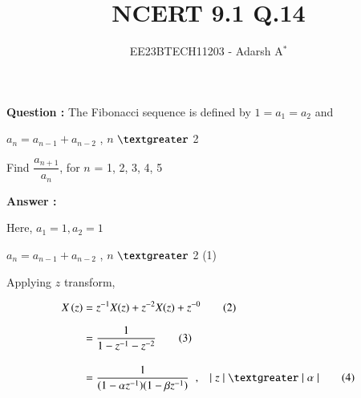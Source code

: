 \documentclass[journal,12pt,twocolumn]{IEEEtran}
\theoremstyle{remark}
\begin{document}
	
	
	\vspace{3cm}
	
	\title{NCERT 9.1 Q.14}
	\author{EE23BTECH11203 - Adarsh A$^{*}$%
	}
	\maketitle
	\bigskip
	
	\renewcommand{\thefigure}{\theenumi}
	\renewcommand{\thetable}{\theenumi}
	
	
	\vspace{0.2cm}
	\linespread{1.1}
	
	
	\textbf{\fontsize{13.5}{20}\selectfont Question : }
	\fontsize{13.5}{20}\selectfont The Fibonacci sequence is defined by $1 = a_1 = a_2$ and \par $a_n = a_{n-1} + a_{n-2}$ , $n$ $\textgreater$ 2
	
	\vspace{0.2cm}
	Find $\dfrac{a_{n + 1}}{a_n}$, for $n$ = 1, 2, 3, 4, 5
	
	\vspace{0.3cm}
	\textbf{\fontsize{13.5}{20}\selectfont Answer : }
	\vspace{0.3cm}
	\fontsize{13.5}{20}\selectfont 
	\fi
	
	
	\vspace{-0.2cm}
	
	\fontsize{13.5}{20}\selectfont
	Here, $a_1 = 1, a_2 = 1$
	
	$a_n = a_{n-1} + a_{n-2}$ , $n$ $\textgreater$ 2 \hfill (1)
	
	\vspace{0.2cm}
	
	Applying $z$ transform,
	
	\vspace{-0.8cm}
	
	\begin{align}
		X\brak z	&= z^{-1} X(z) + z^{-2} X(z) + z^{-0} \tag{2} \\[6pt]
		&= \dfrac{1}{1 - z^{-1} - z^{-2}} \tag{3} \\[10pt]
		&= \dfrac{1}{(1 - \alpha z^{-1})(1 - \beta z^{-1})} \hspace{0.2cm}, \hspace{0.3cm}\lvert \hspace{0.1cm} z \hspace{0.1cm}\rvert \hspace{0.1cm} \textgreater \hspace{0.1cm} \lvert \hspace{0.1cm} \alpha \hspace{0.1cm} \rvert  \tag{4}				
	\end{align}
	
\end{document}
